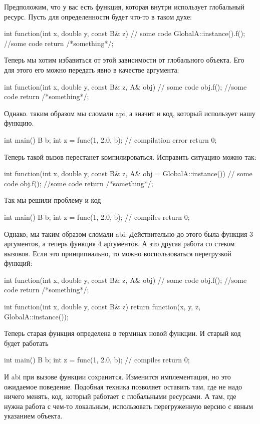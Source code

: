 Предположим, что у вас есть функция, которая внутри использует глобальный ресурс.
Пусть для определенности будет что-то в таком духе:
\begin{cppcode}
int function(int x, double y, const B& z) {
  // some code
  GlobalA::instance().f();
  //some code
  return /*something*/;
}
\end{cppcode}
Теперь мы хотим избавиться от этой зависимости от глобального объекта.
Его для этого его можно передать явно в качестве аргумента:
\begin{cppcode}
int function(int x, double y, const B& z, A& obj) {
  // some code
  obj.f();
  //some code
  return /*something*/;
}
\end{cppcode}
Однако. таким образом мы сломали api, а значит и код, который использует нашу функцию.
\begin{cppcode}
int main() {
  B b;
  int z = func(1, 2.0, b); //  compilation error
  return 0;
}
\end{cppcode}
Теперь такой вызов перестанет компилироваться.
Исправить ситуацию можно так:
\begin{cppcode}
int function(int x, double y, const B& z, A& obj =  GlobalA::instance()) {
  // some code
  obj.f();
  //some code
  return /*something*/;
}
\end{cppcode}
Так мы решили проблему и код
\begin{cppcode}
int main() {
  B b;
  int z = func(1, 2.0, b); // compiles
  return 0;
}
\end{cppcode}
Однако, мы таким образом сломали abi.
Действительно до этого была функция $3$ аргументов, а теперь функция $4$ аргументов.
А это другая работа со стеком вызовов.
Если это принципиально, то можно воспользоваться перегрузкой функций:
\begin{cppcode}
int function(int x, double y, const B& z, A& obj) {
  // some code
  obj.f();
  //some code
  return /*something*/;
}

int function(int x, double y, const B& z) {
  return function(x, y, z, GlobalA::instance());
}
\end{cppcode}
Теперь старая функция определена в терминах новой функции.
И старый код будет работать
\begin{cppcode}
int main() {
  B b;
  int z = func(1, 2.0, b); // compiles
  return 0;
}
\end{cppcode}
И abi при вызове функции сохранится.
Изменится имплементация, но это ожидаемое поведение.
Подобная техника позволяет оставить там, где не надо ничего менять, код, который работает с глобальными ресурсами.
А там, где нужна работа с чем-то локальным, использовать перегруженную версию с явным указанием объекта.

